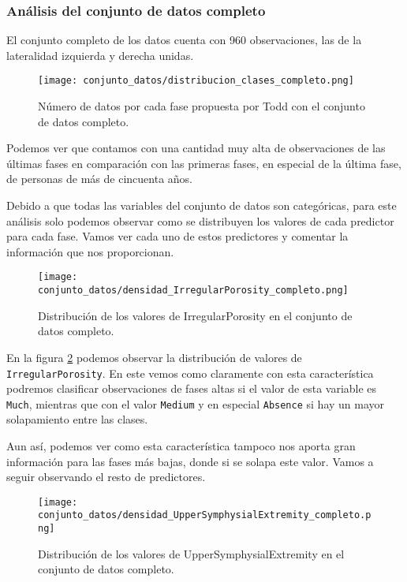 \subsubsection{Análisis del conjunto de datos completo}

El conjunto completo de los datos cuenta con 960 observaciones, las de la lateralidad izquierda y derecha unidas.

\begin{figure}[H]
	\centering
	\texttt{[image: conjunto\_datos/distribucion\_clases\_completo.png]}
	\caption{Número de datos por cada fase propuesta por Todd con el conjunto de datos completo.}
	\label{fig:conteo_c}
\end{figure}


Podemos ver que contamos con una cantidad muy alta de observaciones de las últimas fases en comparación con las primeras fases, en especial de la última fase, de personas de más de cincuenta años.

Debido a que todas las variables del conjunto de datos son categóricas, para este análisis solo podemos observar como se distribuyen los valores de cada predictor para cada fase. Vamos ver cada uno de estos predictores y comentar la información que nos proporcionan.


\begin{figure}[H]
	\centering
	\texttt{[image: conjunto\_datos/densidad\_IrregularPorosity\_completo.png]}
	\caption{Distribución de los valores de IrregularPorosity en el conjunto de datos completo.}
	\label{fig:densidad_IrregularPorosity_completo}
\end{figure}

En la figura \ref{fig:densidad_IrregularPorosity_completo} podemos observar la distribución de valores de \texttt{IrregularPorosity}. En este vemos como claramente con esta característica podremos clasificar observaciones de fases altas si el valor de esta variable es \texttt{Much}, mientras que con el valor \texttt{Medium} y en especial \texttt{Absence} si hay un mayor solapamiento entre las clases.

Aun así, podemos ver como esta característica tampoco nos aporta gran información para las fases más bajas, donde si se solapa este valor. Vamos a seguir observando el resto de predictores.




\begin{figure}[H]
	\centering
	\texttt{[image: conjunto\_datos/densidad\_UpperSymphysialExtremity\_completo.png]}
	\caption{Distribución de los valores de UpperSymphysialExtremity en el conjunto de datos completo.}
	\label{fig:densidad_UpperSymphysialExtremity_completo}
\end{figure}

